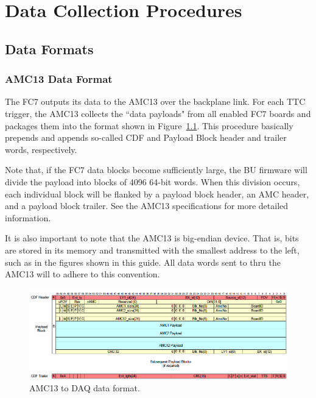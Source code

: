\part{Data Collection Procedures}
{
\setlength{\parskip}{0em}
\DoPToC
}


\chapter{Data Formats}

\section{AMC13 Data Format}

The FC7 outputs its data to the AMC13 over the \uTCA backplane link.  For each TTC trigger, the AMC13 collects the ``data payloads"  from all enabled FC7 boards and packages them into the format shown in Figure~\ref{amc13-output}.  This procedure basically prepends and appends so-called CDF and Payload Block header and trailer words, respectively.

Note that, if the FC7 data blocks become sufficiently large, the BU firmware will divide the payload into blocks of 4096 64-bit words.  When this division occurs, each individual block will be flanked by a payload block header, an AMC header, and a payload block trailer.  See the AMC13 specifications for more detailed information.

It is also important to note that the AMC13 is big-endian device.  That is, bits are stored in its memory and transmitted with the smallest address to the left, such as in the figures shown in this guide.  All data words sent to thru the AMC13 will to adhere to this convention.

\begin{figure}[h]
\hspace{-0.5in}
\includegraphics[width=7.5in]{images/amc13_output.png}
\caption{AMC13 to DAQ data format.}
\label{amc13-output}
\end{figure}

